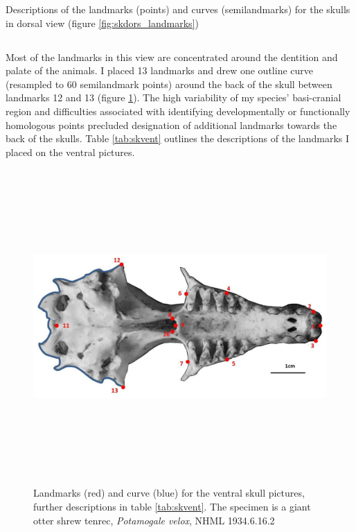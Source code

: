 \begin{table}[h]
	\caption[Skulls: dorsal landmarks]
		{Descriptions of the landmarks (points) and curves (semilandmarks) for the skulls in dorsal view (figure
		\ref{fig:skdors_landmarks})} 
	
	\label{tab:skdors}
\end{table}


\subsection{}

	Most of the landmarks in this view are concentrated around the dentition and palate of the animals. I placed 13 landmarks and drew one outline curve (resampled to 60 semilandmark points) around the back of the skull between landmarks 12 and 13 (figure \ref{fig:skvent_landmarks}). The high variability of my species’ basi-cranial region and difficulties associated with identifying developmentally or functionally homologous points precluded designation of additional landmarks towards the back of the skulls. Table \ref{tab:skvent} outlines the descriptions of the landmarks I placed on the ventral pictures.

\begin{figure}[!htb] 
  \centering
  \includegraphics[width=12cm, height=12cm, keepaspectratio=true]{Methods/figures/skvent_landmarks_pot_vel.jpg}
    \caption[Skulls: ventral landmarks]
    {Landmarks (red) and curve (blue) for the ventral skull pictures, further descriptions in table \ref{tab:skvent}. The specimen is a giant otter shrew tenrec, \textit{Potamogale velox}, NHML 1934.6.16.2}
  \label{fig:skvent_landmarks}
  \end{figure}

